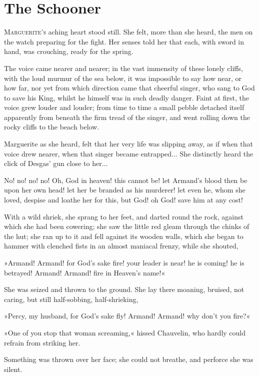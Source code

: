 
\chapter{The Schooner}
\lettrine[lines=4]{M}{arguerite's} aching heart stood still. She felt, more than she heard, the men on the watch preparing for the fight. Her senses told her that each, with sword in hand, was crouching, ready for the spring.

The voice came nearer and nearer; in the vast immensity of these lonely cliffs, with the loud murmur of the sea below, it was impossible to say how near, or how far, nor yet from which direction came that cheerful singer, who sang to God to save his King, whilst he himself was in such deadly danger. Faint at first, the voice grew louder and louder; from time to time a small pebble detached itself apparently from beneath the firm tread of the singer, and went rolling down the rocky cliffs to the beach below.

Marguerite as she heard, felt that her very life was slipping away, as if when that voice drew nearer, when that singer became entrapped... She distinctly heard the click of Desgas' gun close to her...

No! no! no! no! Oh, God in heaven! this cannot be! let Armand's blood then be upon her own head! let her be branded as his murderer! let even he, whom she loved, despise and loathe her for this, but God! oh God! save him at any cost!

With a wild shriek, she sprang to her feet, and darted round the rock, against which she had been cowering; she saw the little red gleam through the chinks of the hut; she ran up to it and fell against its wooden walls, which she began to hammer with clenched fists in an almost maniacal frenzy, while she shouted,\longdash


»Armand! Armand! for God's sake fire! your leader is near! he is coming! he is betrayed! Armand! Armand! fire in Heaven's name!«

She was seized and thrown to the ground. She lay there moaning, bruised, not caring, but still half-sobbing, half-shrieking,\longdash


»Percy, my husband, for God's sake fly! Armand! Armand! why don't you fire?«

»One of you stop that woman screaming,« hissed Chauvelin, who hardly could refrain from striking her.

Something was thrown over her face; she could not breathe, and perforce she was silent.

